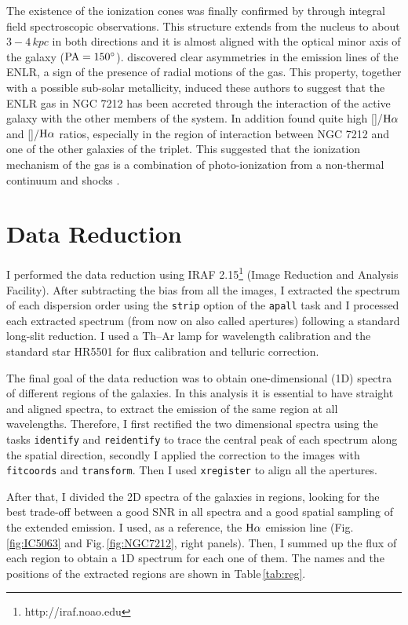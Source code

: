 \documentclass[../main.tex]{subfiles}
\begin{document}
The existence of the ionization cones was finally confirmed by \citet{Cracco11} through integral field spectroscopic observations.
This structure extends from the nucleus to about $3-4\,\si{kpc}$ in both directions and it is almost aligned with the optical minor axis of the galaxy ($\rm PA=\ang{150}$).
\citet{Cracco11} discovered clear asymmetries in the emission lines of the ENLR, a sign of the presence of radial motions of the gas. 
This property, together with a possible sub-solar metallicity, induced these authors to suggest that the ENLR gas in NGC 7212 has been accreted through the interaction of the active galaxy with the other members of the system. 
In addition \citet{Cracco11} found quite high []/$\rm H\alpha$ and []/$\rm H\alpha$ ratios, especially in the region of interaction between NGC 7212 and one of the other galaxies of the triplet. 
This suggested that the ionization mechanism of the gas is a combination of photo-ionization from a non-thermal continuum and shocks \citep{Contini12}.
 

\section{Data Reduction}
\label{sec:datared}

I performed the data reduction using IRAF 2.15\footnote{http://iraf.noao.edu} (Image Reduction and Analysis Facility).
After subtracting the bias from all the images, I extracted the spectrum of each dispersion order using the \verb!strip! option of the \verb!apall! task and I processed each extracted spectrum (from now on also called apertures) following a standard long-slit reduction.
I used a Th--Ar lamp for wavelength calibration and the standard star HR5501 for flux calibration and telluric correction.

The final goal of the data reduction was to obtain one-dimensional (1D) spectra of different regions of the galaxies.
In this analysis it is essential to have straight and aligned spectra, to extract the emission of the same region at all wavelengths. 
Therefore, I first rectified the two dimensional spectra using the tasks \verb!identify! and \verb!reidentify! to trace the central peak of each spectrum along the spatial direction, secondly I applied the correction to the images with \verb!fitcoords! and \verb!transform!. 
Then I used \verb!xregister! to align all the apertures.

After that, I divided the 2D spectra of the galaxies in regions, looking for the best trade-off between a good SNR in all spectra and a good spatial sampling of the extended emission.
I used, as a reference, the $\rm H\alpha$ emission line (Fig.\,\ref{fig:IC5063} and Fig.\,\ref{fig:NGC7212}, right panels).
Then, I summed up the flux of each region to obtain a 1D spectrum for each one of them.
The names and the positions of the extracted regions are shown in Table\,\ref{tab:reg}.
\end{document}

